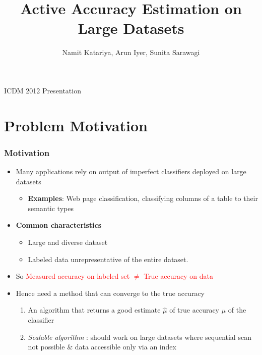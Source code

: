 \documentclass[11pt]{beamer}
\title[]{Active Accuracy Estimation on Large Datasets}
\author {Namit Katariya, Arun Iyer, Sunita Sarawagi}
\newlength{\wideitemsep}
\let\olditem\item
\renewcommand{\item}{\setlength{\itemsep}{\wideitemsep}\olditem}
\begin{document}
\begin{frame}
\titlepage
\begin{center}
\large{ICDM 2012 Presentation} \\ \vspace*{10pt}
\end{center}
\end{frame}




\section{Problem Motivation}
\begin{frame}
\frametitle{Motivation}
\begin{itemize}
\item Many applications rely on output of imperfect classifiers deployed on large datasets \\ 
\begin{itemize}
\item \textbf{Examples}: Web page classification, classifying columns of a table to their semantic types
\end{itemize}
\item \textbf{Common characteristics} 
\begin{itemize}
\item Large and diverse dataset 
\item Labeled data unrepresentative of the entire dataset. 
\end{itemize}
\item So \textcolor{red}{Measured accuracy on labeled set $\neq$ True accuracy on data}
\item Hence need a method that can converge to the true accuracy
\begin{enumerate}
\item An algorithm that returns a good estimate $\hat{\mu}$ of true accuracy $\mu$ of the classifier
\item \textit{Scalable algorithm} : should work on large datasets where sequential scan not possible \& data accessible only via an index
\end{enumerate} 
\end{itemize}
\end{frame}
\end{document}
